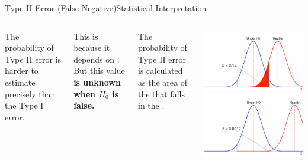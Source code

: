 \begin{frame}{Type II Error (False Negative)}{Statistical Interpretation}
  \begin{columns}[T]
    The probability of Type II error is harder to estimate precisely than the
    Type I error.\bigskip

    This is because it depends on .
    But this value {\bf is unknown when $H_0$ is false.}\bigskip

    The probability of Type II error is calculated as the area of the  that falls in the .

    \includegraphics[width=\textwidth]{../img/beta-a}\\
    \includegraphics[width=\textwidth]{../img/beta-d}
  \end{columns}
\end{frame}

